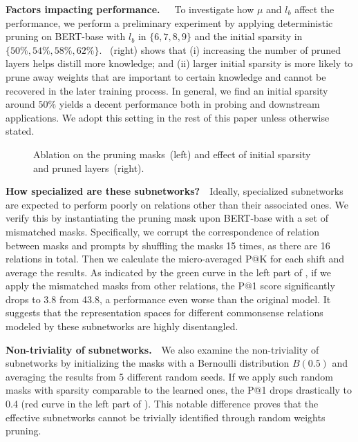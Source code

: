 \noindent
\textbf{Factors impacting performance.}~~~To investigate how $\mu$ and $l_b$ affect the  performance, 
we perform a preliminary experiment by applying deterministic pruning on BERT-base with 
$l_b$ in $\{6,7,8,9\}$ and the initial sparsity in $\{50\%,54\%,58\%,62\%\}$.  
~(right) shows that (i) increasing the number of pruned layers helps distill more knowledge; and
(ii) larger initial sparsity is more likely to prune away weights that are important to certain knowledge and 
cannot be recovered in the later training process. 
In general, we find an initial sparsity around $50\%$ yields a decent performance both in 
probing and downstream applications. We adopt this setting in the rest of this paper 
unless otherwise stated.

\begin{figure}[t]
	\centering
	\caption{Ablation on the pruning masks~(left) and effect of initial sparsity and pruned layers~(right).} \label{fig:both}
\end{figure}

\noindent
\textbf{How specialized are these subnetworks?}~~Ideally, specialized subnetworks are expected to perform poorly 
on relations other than their associated ones. We verify this by instantiating 
the pruning mask upon BERT-base with a set of mismatched masks.
Specifically, we corrupt the correspondence of relation between masks and prompts by shuffling the 
masks 15 times, as there are 16 relations in total. 
Then we calculate the micro-averaged P@K for each shift and average the results. 
As indicated by the green curve in the left part of , 
if we apply the mismatched masks from other relations, the P@1  score significantly drops to 3.8 from 43.8, 
a performance even worse than the original model. It suggests that the representation spaces 
for different commonsense relations modeled by these subnetworks are highly disentangled.

\noindent
\textbf{Non-triviality of subnetworks.}~~We also examine the non-triviality of subnetworks by initializing the masks with a Bernoulli distribution $B(0.5)$ and averaging the results from 5 different random seeds.
If we apply such random masks with sparsity comparable to the learned ones, 
the P@1 drops drastically to 0.4 (red curve in the left part of ). 
This notable difference proves that the effective subnetworks cannot be trivially identified 
through random weights pruning.

